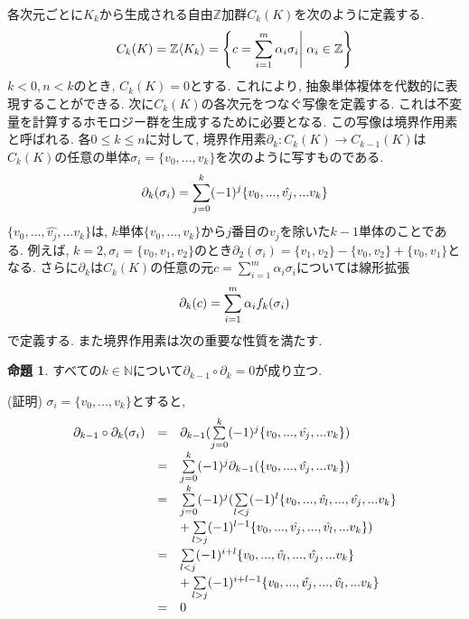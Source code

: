 \documentclass[a4paper]{jsarticle}
\theoremstyle{definition}
\newtheorem{prop}[dfn]{命題}
\begin{document}
各次元ごとに$K_k$から生成される自由$\mathbb{Z}$加群$C_k(K)$を次のように定義する.
\begin{equation}
   C_k(K)= \mathbb{Z}\langle K_k\rangle = \left\{ c=\sum_{i=1}^{m}\alpha_i\sigma_i \middle| \; \alpha_i\in\mathbb{Z} \right\} 
 \notag
\end{equation}
$k<0, n<k$のとき, $C_k(K)=0$とする. これにより, 抽象単体複体を代数的に表現することができる. 次に$C_k(K)$の各次元をつなぐ写像を定義する. これは不変量を計算するホモロジー群を生成するために必要となる. この写像は境界作用素と呼ばれる. 各$0\leq k\leq n$に対して, 境界作用素$\partial_k:C_k(K)\rightarrow C_{k-1}(K)$は$C_k(K)$の任意の単体$\sigma_i=\{v_0,...,v_k\}$を次のように写すものである. 
\begin{equation}
    \partial_k(\sigma_i)=\sum_{j=0}^{k} (-1)^j \{v_0,...,\hat{v_j},...v_k\}\notag
\end{equation}
$\{v_0,...,\hat{v_j},...v_k\}$は, $k$単体$\{v_0,...,v_k\}$から$j$番目の$v_j$を除いた$k-1$単体のことである. 例えば, $k=2, \sigma_i=\{v_0,v_1,v_2\}$のとき$\partial_2(\sigma_i)=\{v_1,v_2\}-\{v_0,v_2\}+\{v_0,v_1\}$となる. さらに$\partial_k$は$C_k(K)$の任意の元$c=\sum_{i=1}^{m}\alpha_i\sigma_i$については線形拡張 
\begin{equation}
    \partial_k(c)=\sum_{i=1}^{m}\alpha_if_k(\sigma_i)\notag
\end{equation}
で定義する. また境界作用素は次の重要な性質を満たす. 
\begin{prop}
    すべての$k\in\mathbb{N}$について$\partial_{k-1}\circ \partial_k=0$が成り立つ. 
\end{prop}
(証明) $\sigma_i=\{v_0,...,v_k\}$とすると, 
\begin{equation}
    \begin{array}{lll}
       \partial_{k-1}\circ \partial_k(\sigma_i)  & = & \partial_{k-1}(\sum\limits_{j=0}^{k} (-1)^j \{v_0,...,\hat{v_j},...v_k\})\\
         & = & \sum\limits_{j=0}^{k} (-1)^j \partial_{k-1}(\{v_0,...,\hat{v_j},...v_k\})\\
         & = & \sum\limits_{j=0}^{k} (-1)^j (\sum\limits_{l<j}^{} (-1)^l\{v_0,...,\hat{v_l},...,\hat{v_j},...v_k\}\\
         & & +\sum\limits_{l>j}^{} (-1)^{l-1}\{v_0,...,\hat{v_j},...,\hat{v_l},...v_k\})\\
         & = & \sum\limits_{l<j}^{} (-1)^{i+l}\{v_0,...,\hat{v_l},...,\hat{v_j},...v_k\}\\
         & & +\sum\limits_{l>j}^{} (-1)^{i+l-1}\{v_0,...,\hat{v_j},...,\hat{v_l},...v_k\}\\
         & = & 0 \notag
    \end{array}
\end{equation} 
\end{document}
